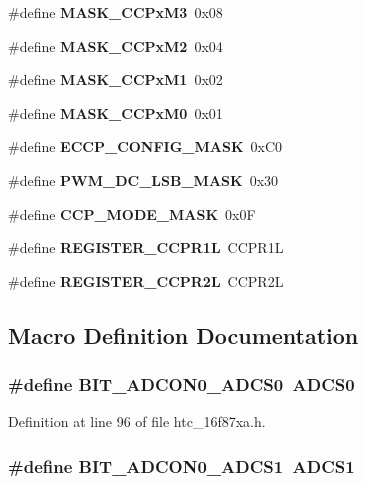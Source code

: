 \begin{DoxyCompactItemize}
\item 
\#define {\bf M\-A\-S\-K\-\_\-\-C\-C\-Px\-M3}~0x08
\item 
\#define {\bf M\-A\-S\-K\-\_\-\-C\-C\-Px\-M2}~0x04
\item 
\#define {\bf M\-A\-S\-K\-\_\-\-C\-C\-Px\-M1}~0x02
\item 
\#define {\bf M\-A\-S\-K\-\_\-\-C\-C\-Px\-M0}~0x01
\item 
\#define {\bf E\-C\-C\-P\-\_\-\-C\-O\-N\-F\-I\-G\-\_\-\-M\-A\-S\-K}~0x\-C0
\item 
\#define {\bf P\-W\-M\-\_\-\-D\-C\-\_\-\-L\-S\-B\-\_\-\-M\-A\-S\-K}~0x30
\item 
\#define {\bf C\-C\-P\-\_\-\-M\-O\-D\-E\-\_\-\-M\-A\-S\-K}~0x0\-F
\item 
\#define {\bf R\-E\-G\-I\-S\-T\-E\-R\-\_\-\-C\-C\-P\-R1\-L}~C\-C\-P\-R1\-L
\item 
\#define {\bf R\-E\-G\-I\-S\-T\-E\-R\-\_\-\-C\-C\-P\-R2\-L}~C\-C\-P\-R2\-L
\end{DoxyCompactItemize}


\subsection{Macro Definition Documentation}
\subsubsection[{B\-I\-T\-\_\-\-A\-D\-C\-O\-N0\-\_\-\-A\-D\-C\-S0}]{\setlength{\rightskip}{0pt plus 5cm}\#define B\-I\-T\-\_\-\-A\-D\-C\-O\-N0\-\_\-\-A\-D\-C\-S0~A\-D\-C\-S0}\label{htc__16f87xa_8h_ac01da456d82b8e7b60dd86924eff1388}


Definition at line 96 of file htc\-\_\-16f87xa.\-h.

\subsubsection[{B\-I\-T\-\_\-\-A\-D\-C\-O\-N0\-\_\-\-A\-D\-C\-S1}]{\setlength{\rightskip}{0pt plus 5cm}\#define B\-I\-T\-\_\-\-A\-D\-C\-O\-N0\-\_\-\-A\-D\-C\-S1~A\-D\-C\-S1}\label{htc__16f87xa_8h_abd27a42001108931cf843e1daee57347}


